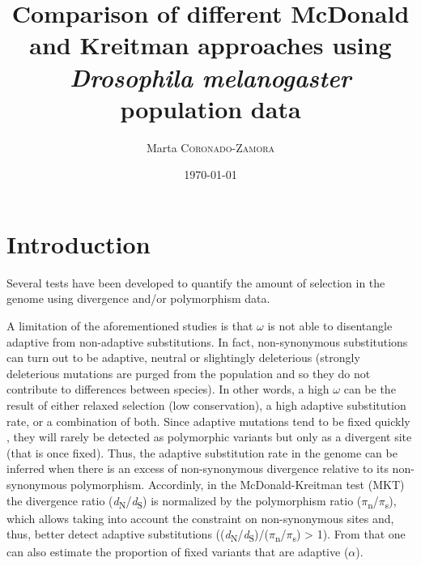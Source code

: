 \documentclass[a4paper]{article}
\title{Comparison of different McDonald and Kreitman approaches using \textit{Drosophila melanogaster} population data} %
\author{Marta \textsc{Coronado-Zamora}} %
\date{\today} %
\begin{document}
\maketitle %

\section{Introduction}

Several tests have been developed to quantify the amount of selection in the genome using divergence and/or polymorphism data. 

A limitation of the aforementioned studies is that $\omega$  is not able to disentangle adaptive from non-adaptive substitutions. In fact, non-synonymous substitutions can turn out to be adaptive, neutral or slightingly deleterious (strongly deleterious mutations are purged from the population and so they do not contribute to differences between species). In other words, a high $\omega$ can be the result of either relaxed selection (low conservation), a high adaptive substitution rate, or a combination of both. Since adaptive mutations tend to be fixed quickly \citep{McDonald1991a,Hudson1987,Sawyer1992,Hurst2002}, they will rarely be detected as polymorphic variants but only as a divergent site (that is once fixed). Thus, the adaptive substitution rate in the genome can be inferred when there is an excess of non-synonymous divergence relative to its non-synonymous polymorphism. Accordinly, in the McDonald-Kreitman test (MKT) \citep{McDonald1991a} 
the divergence ratio (\textit{d}\textsubscript{N}/\textit{d}\textsubscript{S}) is normalized by the polymorphism ratio ($\pi$\textsubscript{n}/$\pi$\textsubscript{s}), which allows taking into account the constraint on non-synonymous sites and, thus, better detect adaptive substitutions ((\textit{d}\textsubscript{N}/\textit{d}\textsubscript{S})/($\pi$\textsubscript{n}/$\pi$\textsubscript{s}) > 1). From that one can also estimate the proportion of fixed variants that are adaptive ($\alpha$).%
\end{document}
